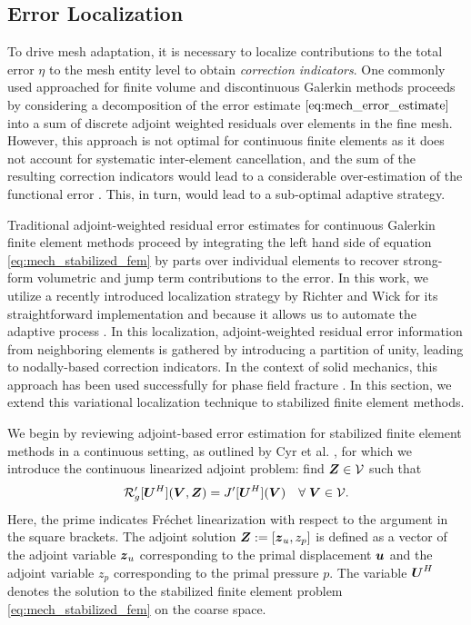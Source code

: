 \subsection{Error Localization}

To drive mesh adaptation, it is necessary to localize contributions to the
total error $\eta$ to the mesh entity level to obtain
\emph{correction indicators}. One commonly used approached for finite volume
and discontinuous Galerkin methods proceeds by considering a decomposition
of the error estimate $\eqref{eq:mech_error_estimate}$ into a sum of discrete
adjoint weighted residuals over elements in the fine mesh. However, this
approach is not optimal for continuous finite elements as it does not account
for systematic inter-element cancellation, and the sum of the resulting
correction indicators would lead to a considerable over-estimation of
the functional error \cite{fidkowski2011review}. This, in turn, would lead to
a sub-optimal adaptive strategy.

Traditional adjoint-weighted residual error estimates for continuous Galerkin
finite element methods proceed by integrating the left hand side of equation
\eqref{eq:mech_stabilized_fem} by parts over individual elements to recover
strong-form volumetric and jump term contributions to the error. In this
work, we utilize a recently introduced localization strategy by Richter and
Wick \cite{richter2015variational} for its straightforward implementation
and because it allows us to automate the adaptive process
\cite{granzow2018automated}. In this localization,
adjoint-weighted residual error information from
neighboring elements is gathered by introducing a partition of unity,
leading to nodally-based correction indicators. In the context of solid
mechanics, this approach has been used successfully for phase field fracture
\cite{wick2016goal}. In this section, we extend this variational localization
technique to stabilized finite element methods.

We begin by reviewing adjoint-based error estimation for stabilized finite
element methods in a continuous setting, as outlined by Cyr et al.
\cite{cyr2014approaches}, for which we introduce the continuous linearized
adjoint problem: find $\boldsymbol{Z} \in \mathcal{V}$ such that
%
\begin{gather}
\mathcal{R}'_g[\boldsymbol{U}^H](\boldsymbol{V}, \boldsymbol{Z}) = J'[\boldsymbol{U}^H](\boldsymbol{V})
\quad \forall \; \boldsymbol{V} \in \mathcal{V}.
\label{eq:mech_continuous_adjoint}
\end{gather}
%
Here, the prime indicates Fr\'{e}chet linearization with respect to the
argument in the square brackets. The adjoint solution $\boldsymbol{Z} :=
[\boldsymbol{z}_u, z_p]$ is defined as a vector of the adjoint variable $\boldsymbol{z}_u$
corresponding to the primal displacement $\boldsymbol{u}$ and the adjoint variable
$z_p$ corresponding to the primal pressure $p$. The variable $\boldsymbol{U}^H$
denotes the solution to the stabilized finite element problem
\eqref{eq:mech_stabilized_fem} on the coarse space.

